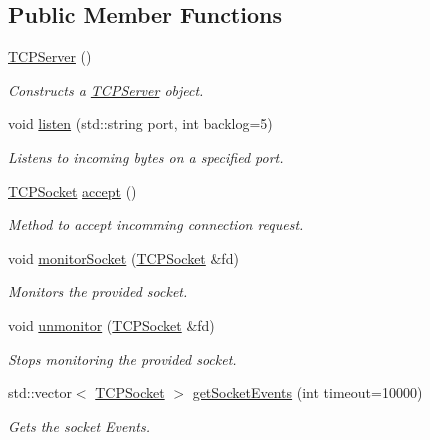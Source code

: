 \subsection*{Public Member Functions}
\begin{DoxyCompactItemize}
\item 
\hyperlink{classTCPServer_a3a5e3cfe42c676ed71f2bc58dcc92bda}{T\+C\+P\+Server} ()
\begin{DoxyCompactList}\small\item\em Constructs a \hyperlink{classTCPServer}{T\+C\+P\+Server} object. \end{DoxyCompactList}\item 
void \hyperlink{classTCPServer_adb2ea4f27e98da84fb9e46838578e516}{listen} (std\+::string port, int backlog=5)
\begin{DoxyCompactList}\small\item\em Listens to incoming bytes on a specified port. \end{DoxyCompactList}\item 
\hyperlink{classTCPSocket}{T\+C\+P\+Socket} \hyperlink{classTCPServer_a1a60f00dce65a4c2b855b37ea9308f6e}{accept} ()
\begin{DoxyCompactList}\small\item\em Method to accept incomming connection request. \end{DoxyCompactList}\item 
void \hyperlink{classTCPServer_a31402d9197a28eab1921b8a96b5c65ef}{monitor\+Socket} (\hyperlink{classTCPSocket}{T\+C\+P\+Socket} \&fd)
\begin{DoxyCompactList}\small\item\em Monitors the provided socket. \end{DoxyCompactList}\item 
void \hyperlink{classTCPServer_a8ee98b8c0f7d23437983627bc980840f}{unmonitor} (\hyperlink{classTCPSocket}{T\+C\+P\+Socket} \&fd)
\begin{DoxyCompactList}\small\item\em Stops monitoring the provided socket. \end{DoxyCompactList}\item 
std\+::vector$<$ \hyperlink{classTCPSocket}{T\+C\+P\+Socket} $>$ \hyperlink{classTCPServer_ae571b398f08601bac4544bc5d1b341a6}{get\+Socket\+Events} (int timeout=10000)
\begin{DoxyCompactList}\small\item\em Gets the socket Events. \end{DoxyCompactList}\end{DoxyCompactItemize}
